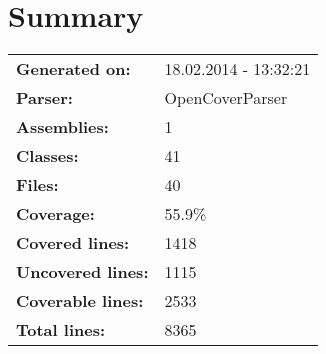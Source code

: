 \documentclass[a4paper,10pt]{article}
\begin{document}
\setcounter{secnumdepth}{-1}
\section{Summary}
\begin{longtable}[l]{ll}
\textbf{Generated on:} & 18.02.2014 - 13:32:21\\
\textbf{Parser:} & OpenCoverParser\\
\textbf{Assemblies:} & 1\\
\textbf{Classes:} & 41\\
\textbf{Files:} & 40\\
\textbf{Coverage:} & 55.9\%\\
\textbf{Covered lines:} & 1418\\
\textbf{Uncovered lines:} & 1115\\
\textbf{Coverable lines:} & 2533\\
\textbf{Total lines:} & 8365\\
\end{longtable}
\end{document}
